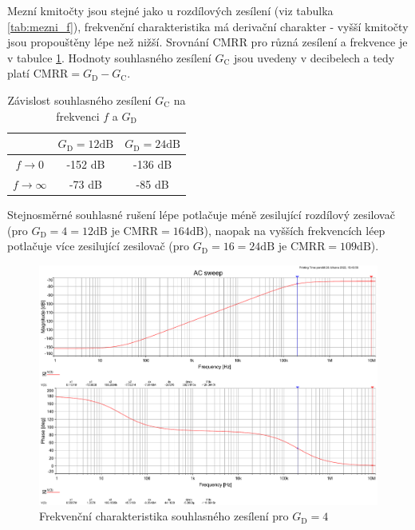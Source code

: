 \documentclass[twoside]{article}
\begin{document}
Mezní kmitočty jsou stejné jako u rozdílových zesílení (viz tabulka \ref{tab:mezni_f}),
frekvenční charakteristika má derivační charakter - vyšší kmitočty jsou propouštěny lépe
než nižší. Srovnání CMRR pro různá zesílení a frekvence je v tabulce \ref{tab:CMRR}.
Hodnoty souhlasného zesílení $G_\text{C}$ jsou uvedeny v decibelech a tedy platí 
$\text{CMRR} = G_\text{D} - G_\text{C}$.

\begin{table}[h!]
    \centering
    \begin{tabular}{c|c|c}
        & $G_\text{D} = 12 \si{\deci\bel}$ & $G_\text{D} = 24 \si{\deci\bel}$ \\ \hline
        $f \to 0$ & -152 dB & -136 dB \\
        $f \to \infty$ & -73 dB & -85 dB
    \end{tabular}
    \caption{Závislost souhlasného zesílení $G_\text{C}$ na frekvenci $f$ a $G_\text{D}$}
    \label{tab:CMRR}
\end{table}

Stejnosměrné souhlasné rušení lépe potlačuje méně zesilující rozdílový zesilovač
(pro $G_\text{D} = 4 = 12 \si{\deci\bel}$ je $\text{CMRR} = 164 \si{\deci\bel}$),
naopak na vyšších frekvencích léep potlačuje více zesilující zesilovač 
(pro $G_\text{D} = 16 = 24 \si{\deci\bel}$ je $\text{CMRR} = 109 \si{\deci\bel}$).

\begin{figure}[h!]
    \centering
    \includegraphics[width=0.92\linewidth]{bode_common_4.pdf}
    \caption{Frekvenční charakteristika souhlasného zesílení pro $G_\text{D} = 4$}
    \label{fig:bode_common_4}
\end{figure}
\end{document}
